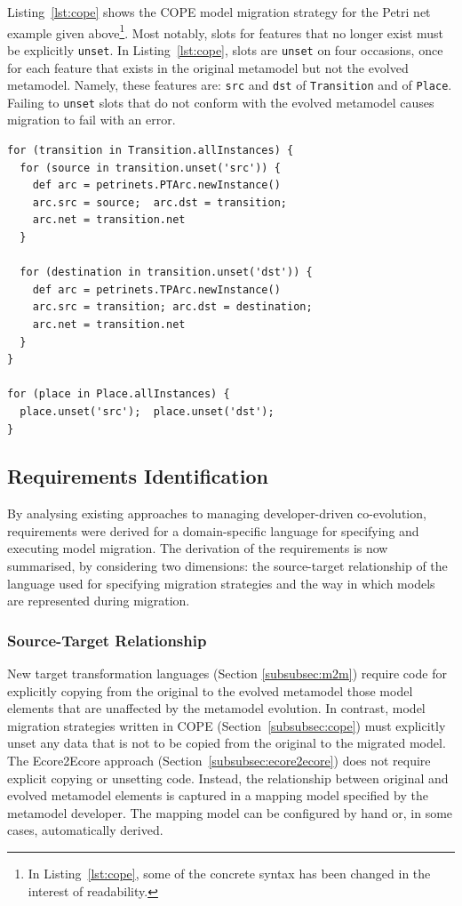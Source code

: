 Listing~\ref{lst:cope} shows the COPE model migration strategy for the Petri net example given above\footnote{In Listing~\ref{lst:cope}, some of the concrete syntax has been changed in the interest of readability.}. Most notably, slots for features that no longer exist must be explicitly \texttt{unset}. In Listing~\ref{lst:cope}, slots are \texttt{unset} on four occasions, once for each feature that exists in the original metamodel but not the evolved metamodel. Namely, these features are: \texttt{src} and \texttt{dst} of \texttt{Transition} and of \texttt{Place}. Failing to \texttt{unset} slots that do not conform with the evolved metamodel causes migration to fail with an error.

\begin{lstlisting}[caption=Petri nets model migration in COPE, label=lst:cope, language=COPE]
for (transition in Transition.allInstances) {
  for (source in transition.unset('src')) {
    def arc = petrinets.PTArc.newInstance()
    arc.src = source;  arc.dst = transition;
    arc.net = transition.net
  }

  for (destination in transition.unset('dst')) {
    def arc = petrinets.TPArc.newInstance() 
    arc.src = transition; arc.dst = destination;
    arc.net = transition.net
  }
}

for (place in Place.allInstances) {
  place.unset('src');  place.unset('dst');
}
\end{lstlisting}


\subsection{Requirements Identification}
\label{subsec:analysis}
By analysing existing approaches to managing developer-driven co-evolution, requirements were derived for a domain-specific language for specifying and executing model migration. The derivation of the requirements is now summarised, by considering two dimensions: the source-target relationship of the language used for specifying migration strategies and the way in which models are represented during migration. %


\subsubsection{Source-Target Relationship}
New target transformation languages (Section \ref{subsubsec:m2m}) require code for explicitly copying from the original to the evolved metamodel those model elements that are unaffected by the metamodel evolution. In contrast, model migration strategies written in COPE (Section~\ref{subsubsec:cope}) must explicitly unset any data that is not to be copied from the original to the migrated model. The Ecore2Ecore approach (Section~\ref{subsubsec:ecore2ecore}) does not require explicit copying or unsetting code. Instead, the relationship between original and evolved metamodel elements is captured in a mapping model specified by the metamodel developer. The mapping model can be configured by hand or, in some cases, automatically derived. 


